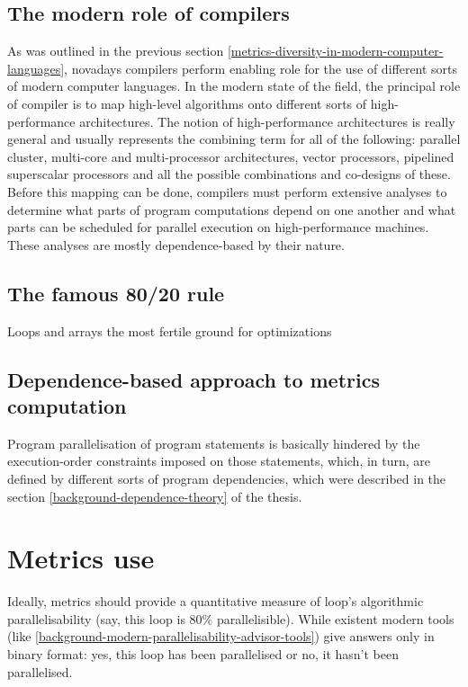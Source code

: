 \subsection{The modern role of compilers}
\label{metrics-modern-role-of-compilers}
\quad As was outlined in the previous section \ref{metrics-diversity-in-modern-computer-languages}, novadays compilers perform enabling role for the use of different sorts of modern computer languages. \newline
\null\quad In the modern state of the field, the principal role of compiler is to map high-level algorithms onto different sorts of high-performance architectures. The notion of high-performance architectures is really general and usually represents the combining term for all of the following: parallel cluster, multi-core and multi-processor architectures, vector processors, pipelined superscalar processors and all the possible combinations and co-designs of these. \newline
\null\quad Before this mapping can be done, compilers must perform extensive analyses to determine what parts of program computations depend on one another and what parts can be scheduled for parallel execution on high-performance machines. These analyses are mostly dependence-based by their nature.   

\subsection{The famous 80/20 rule}
\label{metrics-famous-80-20-rule}
\qquad Loops and arrays the most fertile ground for optimizations

\subsection{Dependence-based approach to metrics computation}
\label{metrics-dependence-based-approach}
\qquad Program parallelisation of program statements is basically hindered by the execution-order constraints imposed on those statements, which, in turn, are defined by different sorts of program dependencies, which were described in the section \ref{background-dependence-theory} of the thesis.   

\section{Metrics use}
\label{metrics-use}
\qquad Ideally, metrics should provide a quantitative measure of loop's algorithmic parallelisability (say, this loop is 80\% parallelisible). While existent modern tools (like \ref{background-modern-parallelisability-advisor-tools}) give answers only in binary format: yes, this loop has been parallelised or no, it hasn't been parallelised.

